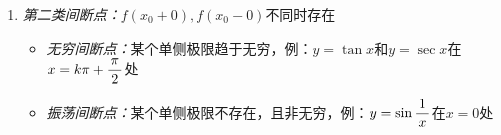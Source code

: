 \begin{enumerate}[(1)]
  \item {\it 第二类间断点：}$f(x_0+0),f(x_0-0)$不同时存在
  \begin{itemize}
    \item {\it 无穷间断点：}某个单侧极限趋于无穷，例：$y=\tan x$和$y=\sec x$在$x=k\pi+\displaystyle\frac{\,{\pi}\,}{\,{2}\,}$处
     \begin{center}
 	\end{center}
    \item {\it 振荡间断点：}某个单侧极限不存在，且非无穷，例：$y=\sin\displaystyle\frac{\,{1}\,}{\,{x}\,}$在$x=0$处
    \begin{center}
 	\end{center}
  \end{itemize}
\end{enumerate}

